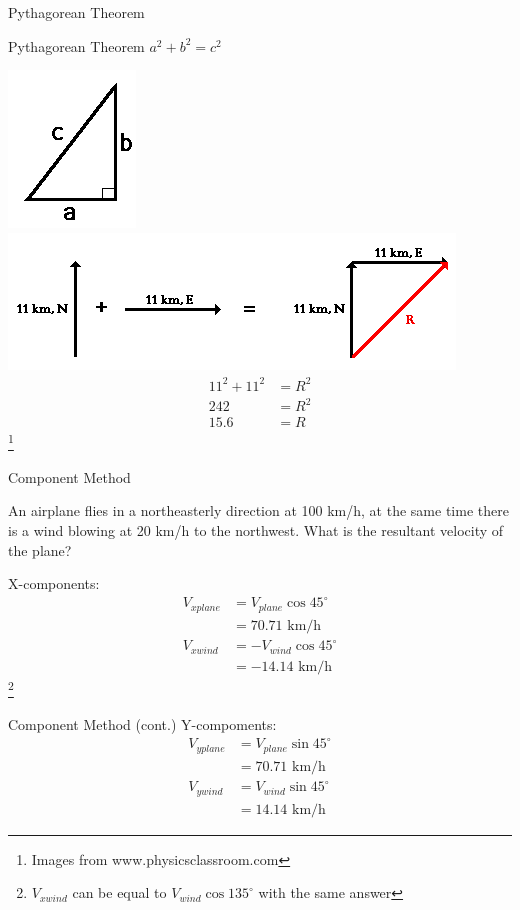 \documentclass[aspectratio=169]{beamer}
\newcommand\blfootnote[1]{%
	\begingroup
	\renewcommand\thefootnote{}\footnote{#1}%
	\addtocounter{footnote}{-1}%
	\endgroup
}
\begin{document}
\begin{frame}{Pythagorean Theorem}
	\begin{block}{Pythagorean Theorem}
		$ a^2 + b^2 = c^2$
	\end{block}
	\includegraphics[scale=0.3]{pytha.png}  \\
	\includegraphics[scale=0.3]{pythaexample.png}
	\centering 
	\begin{align*}
		11^2 + 11^2 &= R^2\\
		242 &= R^2\\
		15.6 &= R
	\end{align*}
	\blfootnote{Images from www.physicsclassroom.com}
\end{frame}

\begin{frame}{Component Method}
	\begin{example}
		An airplane flies in a northeasterly direction at 100 km/h, at the same time there is a wind blowing at 20 km/h to the northwest. What is the resultant velocity of the plane?
	\end{example}
	X-components:
	\begin{align*}
		V_{xplane} &= V_{plane} \cos 45^\circ \\
		&= 70.71 \text{ km/h}	\\
		V_{xwind} &= -V_{wind}  \cos 45^\circ \\
		&= -14.14 \text{ km/h}
	\end{align*}
	\blfootnote{$V_{xwind}$ can be equal to $V_{wind} \cos 135^\circ$ with the same answer}
\end{frame}

\begin{frame}{Component Method (cont.)}
	Y-compoments:
	\begin{align*}
		V_{yplane} &= V_{plane} \sin 45^\circ \\
		&= 70.71 \text{ km/h} \\
		V_{ywind} &= V_{wind}  \sin 45^\circ \\
		&= 14.14 \text{ km/h}
	\end{align*}

\end{frame}
\end{document}
